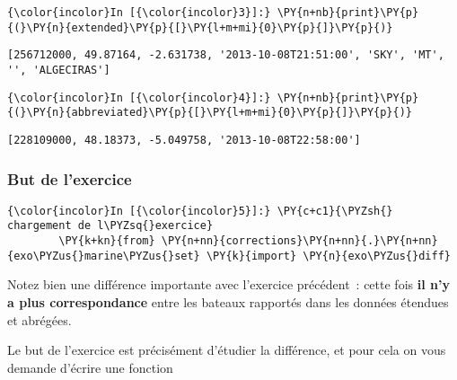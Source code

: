     \begin{Verbatim}[commandchars=\\\{\}]
{\color{incolor}In [{\color{incolor}3}]:} \PY{n+nb}{print}\PY{p}{(}\PY{n}{extended}\PY{p}{[}\PY{l+m+mi}{0}\PY{p}{]}\PY{p}{)}
\end{Verbatim}


    \begin{Verbatim}[commandchars=\\\{\}]
[256712000, 49.87164, -2.631738, '2013-10-08T21:51:00', 'SKY', 'MT', '', 'ALGECIRAS']

    \end{Verbatim}

    \begin{Verbatim}[commandchars=\\\{\}]
{\color{incolor}In [{\color{incolor}4}]:} \PY{n+nb}{print}\PY{p}{(}\PY{n}{abbreviated}\PY{p}{[}\PY{l+m+mi}{0}\PY{p}{]}\PY{p}{)}
\end{Verbatim}


    \begin{Verbatim}[commandchars=\\\{\}]
[228109000, 48.18373, -5.049758, '2013-10-08T22:58:00']

    \end{Verbatim}

    \hypertarget{but-de-lexercice}{%
\subsubsection{But de l'exercice}\label{but-de-lexercice}}

    \begin{Verbatim}[commandchars=\\\{\}]
{\color{incolor}In [{\color{incolor}5}]:} \PY{c+c1}{\PYZsh{} chargement de l\PYZsq{}exercice}
        \PY{k+kn}{from} \PY{n+nn}{corrections}\PY{n+nn}{.}\PY{n+nn}{exo\PYZus{}marine\PYZus{}set} \PY{k}{import} \PY{n}{exo\PYZus{}diff}
\end{Verbatim}


    Notez bien une différence importante avec l'exercice précédent~: cette
fois \textbf{il n'y a plus correspondance} entre les bateaux rapportés
dans les données étendues et abrégées.

Le but de l'exercice est précisément d'étudier la différence, et pour
cela on vous demande d'écrire une fonction

\begin{Shaded}
\begin{Highlighting}[]
\end{Highlighting}
\end{Shaded}

